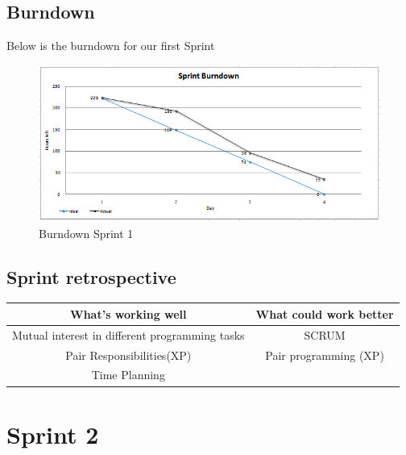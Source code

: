 \subsection{Burndown}
Below is the burndown for our first Sprint
\begin{figure}[h]
\includegraphics[scale=0.7]{img/SCRUM/burndownSprint1.png}
\caption{Burndown Sprint 1}
\label{fig:Burndown Sprint 1}
\end{figure}


\subsection{Sprint retrospective}

\begin{center}
\begin{tabular}{|c|c|}
\hline \textbf{What's working well} & \textbf{What could work better} \\ 
\hline Mutual interest in different programming tasks & SCRUM \\ 
Pair Responsibilities(XP) & Pair programming (XP) \\ 
 Time Planning &  \\ 
\hline 
\end{tabular} 
\end{center}



\newpage
\section{Sprint 2}
\label{chap:Spring 2}

